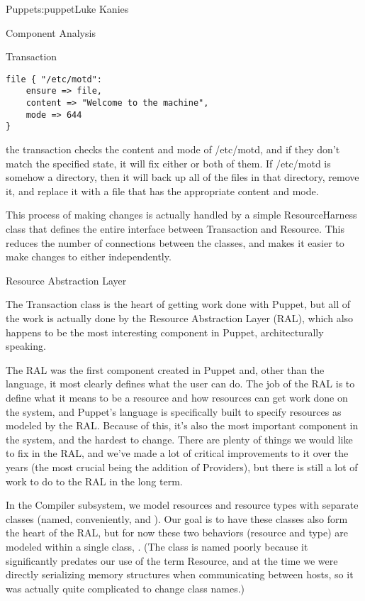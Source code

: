 \begin{aosachapter}{Puppet}{s:puppet}{Luke Kanies}
\begin{aosasect1}{Component Analysis}
\begin{aosasect2}{Transaction}
\begin{verbatim}
file { "/etc/motd":
    ensure => file,
    content => "Welcome to the machine",
    mode => 644
}
\end{verbatim}

\noindent the transaction checks the content and mode of /etc/motd, and if
they don't match the specified state, it will fix either or both of
them.  If /etc/motd is somehow a directory, then it will back up all
of the files in that directory, remove it, and replace it with a file
that has the appropriate content and mode.

This process of making changes is actually handled by a simple
ResourceHarness class that defines the entire interface between
Transaction and Resource.  This reduces the number of connections
between the classes, and makes it easier to make changes to either
independently.

\end{aosasect2}

\begin{aosasect2}{Resource Abstraction Layer}

The Transaction class is the heart of getting work done with Puppet,
but all of the work is actually done by the Resource Abstraction Layer
(RAL), which also happens to be the most interesting component in
Puppet, architecturally speaking.

The RAL was the first component created in Puppet and, other than the
language, it most clearly defines what the user can do.  The job of the
RAL is to define what it means to be a resource and how resources can
get work done on the system, and Puppet's language is specifically
built to specify resources as modeled by the RAL.  Because of this,
it's also the most important component in the system, and the hardest
to change.  There are plenty of things we would like to fix in the
RAL, and we've made a lot of critical improvements to it over the
years (the most crucial being the addition of Providers), but there is
still a lot of work to do to the RAL in the long term.

In the Compiler subsystem, we model resources and resource types with
separate classes (named, conveniently,  and
).  Our goal is to have these classes also form
the heart of the RAL, but for now these two behaviors (resource and
type) are modeled within a single class, .  (The class is
named poorly because it significantly predates our use of the term
Resource, and at the time we were directly serializing memory
structures when communicating between hosts, so it was actually quite
complicated to change class names.)


\end{aosasect2}
\end{aosasect1}
\end{aosachapter}
